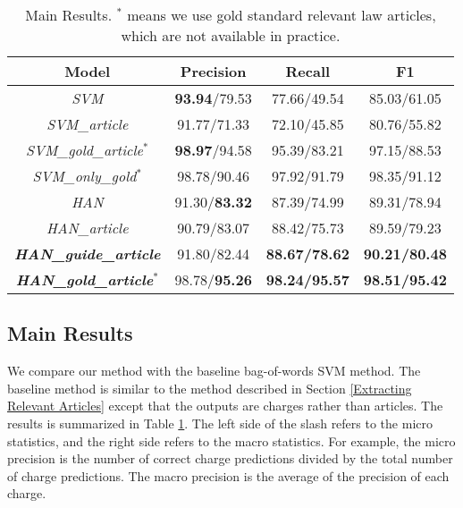 \begin{table}
\centering
\small{
\begin{tabular}{|c|c|c|c|}
\hline
\textbf{Model}				& \textbf{Precision} 	& \textbf{Recall} 		& \textbf{F1} 	\\
\hline
\textit{SVM} 				& \textbf{93.94}/79.53					& 77.66/49.54  					& 85.03/61.05 				 	\\
\hline
\textit{SVM\_article} 			& 91.77/71.33					& 72.10/45.85  					& 80.76/55.82				 	\\
\hline
\textit{SVM\_gold\_article$^*$} 	& \textbf{98.97}/94.58			& 95.39/83.21  					& 97.15/88.53					\\
\hline
\textit{SVM\_only\_gold$^*$} 		& 98.78/90.46					& 97.92/91.79  					& 98.35/91.12					\\
\hline
\textit{HAN}				& 91.30/\textbf{83.32}			& 87.39/74.99  					& 89.31/78.94					\\
\hline
\textit{HAN\_article}			& 90.79/83.07					& 88.42/75.73  					& 89.59/79.23					\\
\hline
\textbf{\textit{HAN\_guide\_article}} 	& 91.80/82.44 					& \textbf{88.67/78.62} 			& \textbf{90.21/80.48} 		 	\\
\hline
\textbf{\textit{HAN\_gold\_article$^*$}} 		& 98.78/\textbf{95.26} 			& \textbf{98.24/95.57} 			& \textbf{98.51/95.42} 			\\
\hline
\end{tabular}
}
\caption{Main Results. $^*$ means we use gold standard relevant law articles, which are not available in practice.}
\label{tabble_main_results}
\end{table}



\subsection{Main Results}
We compare our method with the baseline bag-of-words SVM method. The baseline method is similar to the method described in Section \ref{Extracting Relevant Articles} except that the outputs are charges rather than articles. The results is summarized in Table \ref{tabble_main_results}. The left side of the slash refers to the micro statistics, and the right side refers to the macro statistics. For example, the micro precision is the number of correct charge predictions divided by the total number of charge predictions. The macro precision is the average of the precision of each charge. %

